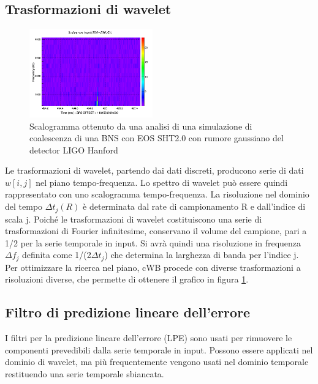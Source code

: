 \subsection{Trasformazioni di wavelet}
\label{subsection:wavelet_transform}
\begin{figure}
	\vspace{-35pt}
	\begin{center}
		\includegraphics[width=0.475\textwidth]{figures/Capitolo_3/L1_scalogram_0.png}
	\end{center}
	\vspace{-5pt}
	\caption{Scalogramma ottenuto da una analisi di una simulazione di coalescenza di una BNS con EOS SHT2.0 con rumore gaussiano del detector LIGO Hanford}
	\label{fig:scalogram_example}
	\vspace{-40pt}
\end{figure}
Le trasformazioni di wavelet, partendo dai dati discreti, producono serie di dati $w[i,j]$ nel piano tempo-frequenza. Lo spettro di wavelet può essere quindi rappresentato con uno scalogramma tempo-frequenza. La risoluzione nel dominio del tempo $\Delta t_j(R)$ è determinata dal rate di campionamento R e dall'indice di scala j. Poiché le trasformazioni di wavelet costituiscono una serie di trasformazioni di Fourier infinitesime, conservano il volume del campione, pari a 1/2 per la serie temporale in input. Si avrà quindi una risoluzione in frequenza $\Delta f_j$ definita come 1/(2$\Delta t_j$) che determina la larghezza di banda per l'indice j. Per ottimizzare la ricerca nel piano, cWB procede con diverse trasformazioni a risoluzioni diverse, che permette di ottenere il grafico in figura \ref{fig:scalogram_example}.
\subsection{Filtro di predizione lineare dell'errore}
\label{subsection:lpe_filter}
I filtri per la predizione lineare dell'errore (LPE) sono usati per rimuovere le componenti prevedibili dalla serie temporale in input. Possono essere applicati nel dominio di wavelet, ma più frequentemente vengono usati nel dominio temporale restituendo una serie temporale sbiancata.

